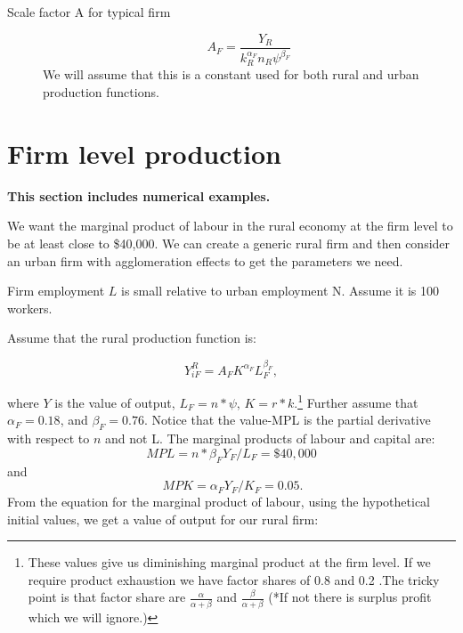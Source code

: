 \documentclass[]{article}
\begin{document}
\begin{description}


\item[Scale factor A for typical firm] 
\[A_F= \frac{Y_R}{k_R^{\alpha_F} {n_R\psi}^{\beta_F}}\]
We will assume that this is a constant used for both rural and urban production functions. 



\end{description}


\section{Firm level production}  
 \textbf{This section includes numerical examples.
 }


We want the marginal product of labour in the rural economy at the firm level to be at least close to \$40,000.  We can create a generic rural firm and then consider an urban firm with agglomeration effects to get the parameters we need. 

Firm employment $L$ is small relative to  urban employment {N}. Assume it is 100 workers. 

Assume that the rural production function is: 

\[ Y_{iF}^R=A_{F} K^{\alpha_F} L_F^{\beta_F}, \]

where $Y$ is the value of output, $L_F=n*\psi$, $K=r*k$.\footnote{These values give us diminishing marginal product at the firm level. If we require product exhaustion we have factor shares of  0.8 and 0.2 .The tricky point is that factor share are 
 $\frac{\alpha}{\alpha + \beta}$ and $\frac{\beta}{\alpha + \beta}$
(*If not there is surplus profit  which we will ignore.)}
Further assume that $\alpha_F=0.18 $,  and $\beta_F=0.76$. Notice that the value-MPL is the partial derivative with respect to $n$ and not L. 
The marginal products of labour and capital are: 
\[MPL=n*\beta_F Y_F/L_F=\$40,000\] and\[\ MPK=\alpha_F Y_F/K_F =0.05.\]
From the equation for the marginal product of labour, using the hypothetical initial values, we get a value of output for our rural firm:
\end{document}
